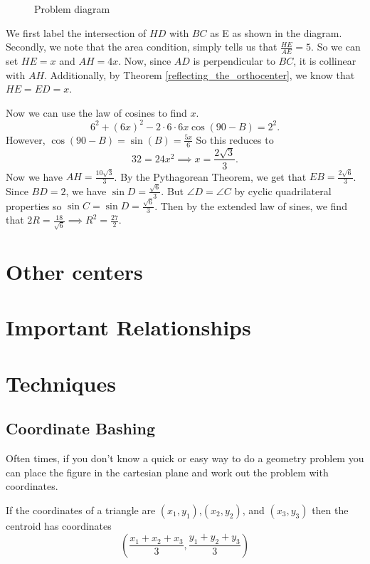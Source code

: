 \documentclass[11pt]{scrartcl}
\theoremstyle{plain}
\begin{document}
\begin{figure}[H]
    \centering
    \scalebox{.5}{}
    \caption{Problem diagram}
    \label{fig:pumac_problem}
\end{figure}
\begin{soln}
    We first label the intersection of $HD$ with $BC$ as E as shown in the diagram.
    Secondly, we note that the area condition, simply tells us that $\frac{HE}{AE}=5$. So we can set $HE=x$ and $AH=4x$.
    Now, since $AD$ is perpendicular to $BC$, it is collinear with $AH$. Additionally, by 
    Theorem \ref{reflecting_the_orthocenter}, we know that $HE=ED=x$.

    Now we can use the law of cosines to find $x$. $$6^2+(6x)^2-2\cdot 6\cdot 6x \cos(90-B)=2^2.$$ However, $\cos(90-B)=\sin(B)=\frac{5x}{6}$
    So this reduces to $$32=24x^2 \implies x=\frac{2\sqrt{3}}{3}.$$
    Now we have $AH=\frac{10\sqrt{3}}{3}$. By the Pythagorean Theorem, we get that $EB=\frac{2\sqrt{6}}{3}$. Since $BD=2$, we have $\sin{D}=\frac{\sqrt{6}}{3}$.
    But $\angle D = \angle C$ by cyclic quadrilateral properties so $\sin{C}=\sin{D}=\frac{\sqrt{6}}{3}$. Then by the extended law of sines, we find that 
    $2R = \frac{18}{\sqrt{6}} \implies R^2=\boxed{\frac{27}{2}}$.
\end{soln}
\section{Other centers}
\section{Important Relationships}
\section{Techniques}
    \subsection{Coordinate Bashing}
    Often times, if you don't know a quick or easy way to do a geometry problem you can place the figure in the cartesian plane and work out the problem with coordinates.
    
        \begin{theorem}
            If the coordinates of a triangle are $(x_1,y_1)$,$(x_2,y_2)$, and $(x_3,y_3)$ then the centroid has coordinates $$\left(\frac{x_1+x_2+x_3}{3},\frac{y_1+y_2+y_3}{3}\right)$$
        \end{theorem}
        
\end{document}
